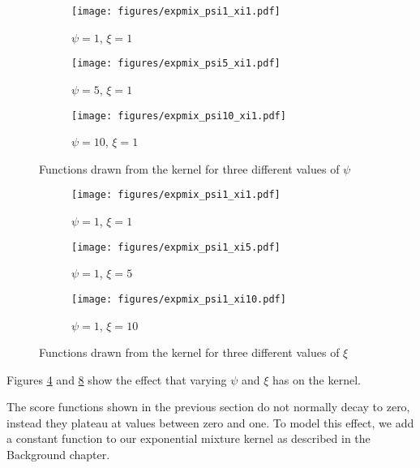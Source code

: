 \documentclass[a4paper,12pt,twoside,openright]{report}
\begin{document}
\begin{figure}
\centering
\begin{subfigure}{.33\textwidth}
  \centering
  \texttt{[image: figures/expmix\_psi1\_xi1.pdf]}
  \caption{$\psi=1$, $\xi=1$}
  \label{expmix11}
\end{subfigure}%
\begin{subfigure}{.33\textwidth}
  \centering
  \texttt{[image: figures/expmix\_psi5\_xi1.pdf]}
  \caption{$\psi=5$, $\xi=1$}
  \label{expmix51}
\end{subfigure}%
\begin{subfigure}{.33\textwidth}
  \centering
  \texttt{[image: figures/expmix\_psi10\_xi1.pdf]}
  \caption{$\psi=10$, $\xi=1$}
  \label{expmix101}
\end{subfigure}
\caption{Functions drawn from the kernel for three different values of $\psi$}
\label{kernelpsi}
\end{figure}

\begin{figure}
\centering
\begin{subfigure}{.33\textwidth}
  \centering
  \texttt{[image: figures/expmix\_psi1\_xi1.pdf]}
  \caption{$\psi=1$, $\xi=1$}
  \label{expmix11_}
\end{subfigure}%
\begin{subfigure}{.33\textwidth}
  \centering
  \texttt{[image: figures/expmix\_psi1\_xi5.pdf]}
  \caption{$\psi=1$, $\xi=5$}
  \label{expmix15}
\end{subfigure}%
\begin{subfigure}{.33\textwidth}
  \centering
  \texttt{[image: figures/expmix\_psi1\_xi10.pdf]}
  \caption{$\psi=1$, $\xi=10$}
  \label{expmix110}
\end{subfigure}
\caption{Functions drawn from the kernel for three different values of $\xi$}
\label{kernelxi}
\end{figure}

Figures \ref{kernelpsi} and \ref{kernelxi} show the effect that varying $\psi$ and $\xi$ has on the kernel.

The score functions shown in the previous section do not normally decay to zero, instead they plateau at values between zero and one. To model this effect, we add a constant function to our exponential mixture kernel as described in the Background chapter.
\end{document}

